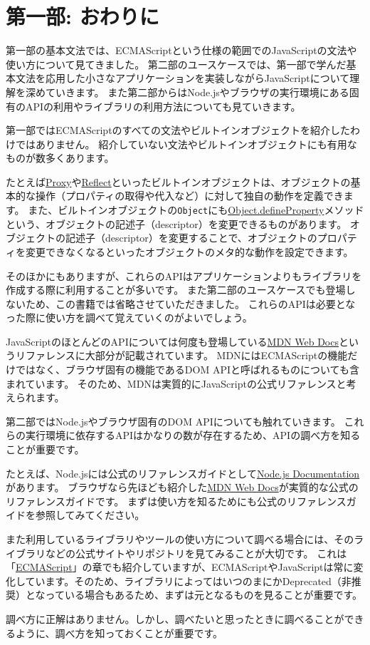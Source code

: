 \hypertarget{end-of-basic-grammar}{%
\chapter*{第一部: おわりに}\label{end-of-basic-grammar}}

第一部の基本文法では、ECMAScriptという仕様の範囲でのJavaScriptの文法や使い方について見てきました。
第二部のユースケースでは、第一部で学んだ基本文法を応用した小さなアプリケーションを実装しながらJavaScriptについて理解を深めていきます。
また第二部からはNode.jsやブラウザの実行環境にある固有のAPIの利用やライブラリの利用方法についても見ていきます。

第一部ではECMAScriptのすべての文法やビルトインオブジェクトを紹介したわけではありません。
紹介していない文法やビルトインオブジェクトにも有用なものが数多くあります。

たとえば\href{https://developer.mozilla.org/ja/docs/Web/JavaScript/Reference/Global_Objects/Proxy}{Proxy}や\href{https://developer.mozilla.org/ja/docs/Web/JavaScript/Reference/Global_Objects/Reflect}{Reflect}といったビルトインオブジェクトは、オブジェクトの基本的な操作（プロパティの取得や代入など）に対して独自の動作を定義できます。
また、ビルトインオブジェクトの\texttt{Object}にも\href{https://developer.mozilla.org/ja/docs/Web/JavaScript/Reference/Global_Objects/Object/defineProperty}{Object.defineProperty}メソッドという、オブジェクトの記述子（descriptor）を変更できるものがあります。
オブジェクトの記述子（descriptor）を変更することで、オブジェクトのプロパティを変更できなくなるといったオブジェクトのメタ的な動作を設定できます。

そのほかにもありますが、これらのAPIはアプリケーションよりもライブラリを作成する際に利用することが多いです。
また第二部のユースケースでも登場しないため、この書籍では省略させていただきました。
これらのAPIは必要となった際に使い方を調べて覚えていくのがよいでしょう。

JavaScriptのほとんどのAPIについては何度も登場している\href{https://developer.mozilla.org/ja/}{MDN
Web Docs}というリファレンスに大部分が記載されています。
MDNにはECMAScriptの機能だけではなく、ブラウザ固有の機能であるDOM
APIと呼ばれるものについても含まれています。
そのため、MDNは実質的にJavaScriptの公式リファレンスと考えられます。

第二部ではNode.jsやブラウザ固有のDOM APIについても触れていきます。
これらの実行環境に依存するAPIはかなりの数が存在するため、APIの調べ方を知ることが重要です。

たとえば、Node.jsには公式のリファレンスガイドとして\href{https://nodejs.org/api/}{Node.js
Documentation}があります。
ブラウザなら先ほども紹介した\href{https://developer.mozilla.org/ja/}{MDN
Web Docs}が実質的な公式のリファレンスガイドです。
まずは使い方を知るためにも公式のリファレンスガイドを参照してみてください。

また利用しているライブラリやツールの使い方について調べる場合には、そのライブラリなどの公式サイトやリポジトリを見てみることが大切です。
これは「\href{../ecmascript/README.md}{ECMAScript}」の章でも紹介していますが、ECMAScriptやJavaScriptは常に変化しています。そのため、ライブラリによってはいつのまにかDeprecated（非推奨）となっている場合もあるため、まずは元となるものを見ることが重要です。

調べ方に正解はありません。しかし、調べたいと思ったときに調べることができるように、調べ方を知っておくことが重要です。
